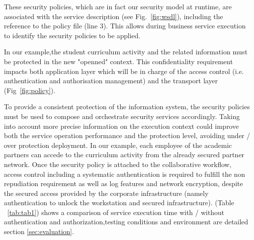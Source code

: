 \documentclass[runningheads,a4paper]{llncs}
\begin{document}
These security policies, which are in fact our security model at runtime, are associated with the service description (see Fig.~\ref{fig:wsdl}), including the reference to the policy file (line 3). This allows during business service execution to identify the security policies to be applied.



In our example,the student curriculum activity and the related information must be protected in the new "openned" context. This confidentiality requirement impacts both application layer which will be in charge of the access control (i.e. authentication and authorisation management) and the transport layer (Fig~\ref{fig:policy}). 

To provide a consistent protection of the information system, the security policies must be used to compose and orchestrate security services accordingly. Taking into account more precise information on the execution context could improve both the service operation performance and the protection level, avoiding under / over protection deployment. In our example, each employee of the academic partners can accede to the curriculum activity from the already secured partner network. Once the security policy is attached to the collaborative workflow, access control including a systematic authentication is required to fulfill the non repudiation requirement as well as log features and network encryption, despite the secured access provided by the corporate infrastructure (namely authentication to unlock the workstation and secured infrastructure). (Table ~\ref{tab:tab1}) shows a comparison of service execution time with / without authentication and authorization,testing conditions and environment are detailed section \ref{sec:evaluation}.
\end{document}
